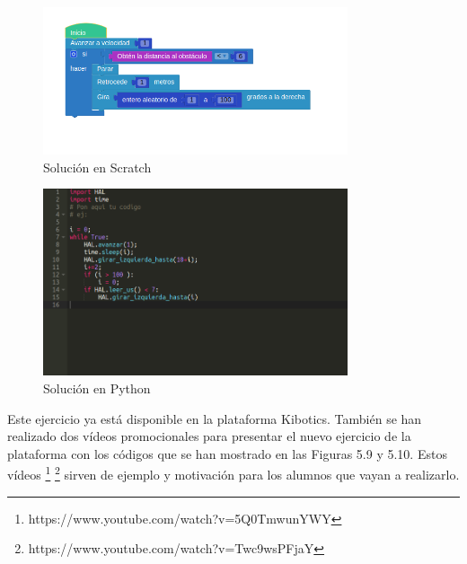 \begin{figure}[H]
    \centering
    \includegraphics[width=0.8\textwidth, height=0.4\textwidth]{chapters/images/solucionroombascratch.png}
    \caption{Solución en Scratch }
    \label{fig:my_label}
\end{figure}
\begin{figure}[H]
    \centering
    \includegraphics[width=0.8\textwidth, height=0.4\textwidth]{chapters/images/solucionroombapython.png}
    \caption{Solución en Python}
    \label{fig:my_label}
\end{figure}

Este ejercicio ya está disponible en la plataforma Kibotics. También se han realizado dos vídeos promocionales para presentar el nuevo ejercicio de la plataforma con los códigos que se han mostrado en las Figuras 5.9 y 5.10. Estos vídeos \footnote{https://www.youtube.com/watch?v=5Q0TmwunYWY} \footnote{https://www.youtube.com/watch?v=Twc9wsPFjaY} sirven de ejemplo y motivación para los alumnos que vayan a realizarlo.